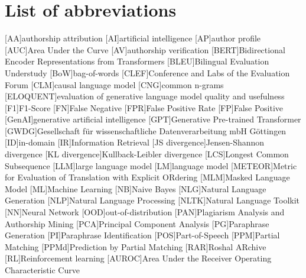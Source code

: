 \chapter*{List of abbreviations}

\begin{acronym}[XXXXXXXXX]
    [AA]{authorship attribution}
    [AI]{artificial intelligence}
    [AP]{author profile}
    [AUC]{Area Under the Curve}
    [AV]{authorship verification}
    [BERT]{Bidirectional Encoder Representations from Transformers}
    [BLEU]{Bilingual Evaluation Understudy}
    [BoW]{bag-of-words}
    [CLEF]{Conference and Labs of the Evaluation Forum}
    [CLM]{causal language model}
    [CNG]{common n-grams}
    [ELOQUENT]{evaluation of generative language model quality and usefulness}
    [F1]{F1-Score}
    [FN]{False Negative}
    [FPR]{False Positive Rate}
    [FP]{False Positive}
    [GenAI]{generative artificial intelligence}
    [GPT]{Generative Pre-trained Transformer}
    [GWDG]{Gesellschaft für wissenschaftliche Datenverarbeitung mbH Göttingen}
    [ID]{in-domain}
    [IR]{Information Retrieval}
    [JS divergence]{Jensen-Shannon divergence}
    [KL divergence]{Kullback-Leibler divergence}
    [LCS]{Longest Common Subsequence}
    [LLM]{large language model}
    [LM]{language model}
    [METEOR]{Metric for Evaluation of Translation with Explicit ORdering}
    [MLM]{Masked Language Model}
    [ML]{Machine Learning}
    [NB]{Naive Bayes}
    [NLG]{Natural Language Generation}
    [NLP]{Natural Language Processing}
    [NLTK]{Natural Language Toolkit}
    [NN]{Neural Network}
    [OOD]{out-of-distribution}
    [PAN]{Plagiarism Analysis and Authorship Mining} %
    [PCA]{Principal Component Analysis}
    [PG]{Paraphrase Generation}
    [PI]{Paraphrase Identification}
    [POS]{Part-of-Speech}
    [PPM]{Partial Matching}
    [PPMd]{Prediction by Partial Matching}
    [RAR]{Roshal ARchive}
    [RL]{Reinforcement learning}
    [AUROC]{Area Under the Receiver Operating Characteristic Curve}

\end{acronym}
